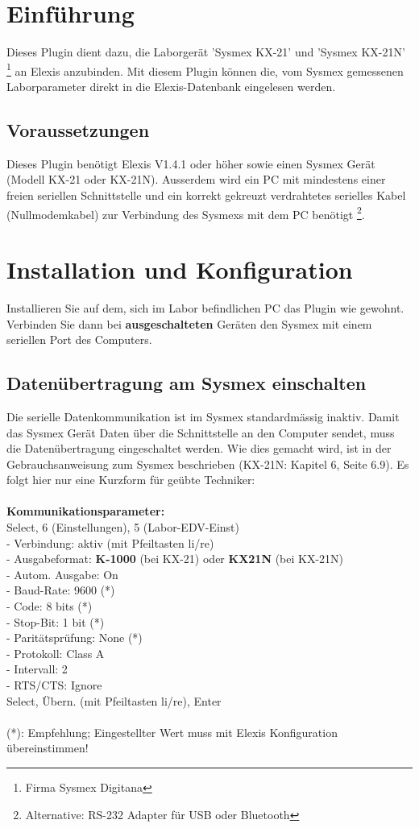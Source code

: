\documentclass[a4paper]{scrartcl}
\begin{document}
\section{Einf\"uhrung}
Dieses Plugin dient dazu, die Laborger\"at 'Sysmex KX-21' und 'Sysmex KX-21N' \footnote{Firma Sysmex Digitana} an Elexis anzubinden. Mit diesem Plugin k\"onnen die, vom Sysmex gemessenen Laborparameter direkt in die Elexis-Datenbank eingelesen werden.

\subsection{Voraussetzungen}
Dieses Plugin ben\"otigt Elexis V1.4.1 oder h\"oher sowie einen Sysmex Ger\"at (Modell KX-21 oder KX-21N). Ausserdem wird ein PC mit mindestens einer freien seriellen Schnittstelle und ein korrekt gekreuzt verdrahtetes serielles Kabel (Nullmodemkabel) zur Verbindung des Sysmexs mit dem PC ben\"otigt \footnote{Alternative: RS-232 Adapter f\"ur USB oder Bluetooth}.

\section{Installation und Konfiguration}
Installieren Sie auf dem, sich im Labor befindlichen PC das Plugin wie gewohnt. Verbinden Sie dann bei \textbf{ausgeschalteten} Ger\"aten den Sysmex mit einem seriellen Port des Computers. 
\subsection{Daten\"ubertragung am Sysmex einschalten}
Die serielle Datenkommunikation ist im Sysmex standardm\"assig inaktiv. Damit das Sysmex Ger\"at Daten \"uber die Schnittstelle an den Computer sendet, muss die Daten\"ubertragung eingeschaltet werden. Wie dies gemacht wird, ist in der Gebrauchsanweisung zum Sysmex beschrieben (KX-21N: Kapitel 6, Seite 6.9). Es folgt hier nur eine Kurzform f\"ur ge\"ubte Techniker:\\
\\
\textbf{Kommunikationsparameter:}\\
Select, 6 (Einstellungen), 5 (Labor-EDV-Einst)\\
 - Verbindung: aktiv (mit Pfeiltasten li/re)\\
 - Ausgabeformat: \textbf{K-1000} (bei KX-21) oder \textbf{KX21N} (bei KX-21N)\\
 - Autom. Ausgabe: On\\
 - Baud-Rate: 9600 (*)\\
 - Code: 8 bits (*)\\
 - Stop-Bit: 1 bit (*)\\
 - Parit\"atspr\"ufung: None (*)\\
 - Protokoll: Class A\\
 - Intervall: 2\\
 - RTS/CTS: Ignore\\
Select, \"Ubern. (mit Pfeiltasten li/re), Enter\\
\\
(*): Empfehlung; Eingestellter Wert muss mit Elexis Konfiguration \"ubereinstimmen!
\end{document}
